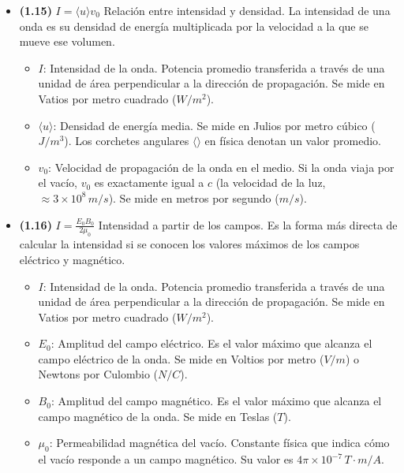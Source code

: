 \documentclass{article}
\begin{document}
\begin{itemize}
				\item \textbf{(1.15)} $\boxed{I=\langle u\rangle v_{0}}$ Relación entre intensidad y densidad. La intensidad de una onda es su densidad de energía multiplicada por la velocidad a la que se mueve ese volumen.
					\begin{itemize}
						\item $I$: Intensidad de la onda. Potencia promedio transferida a través de una unidad de área perpendicular a la dirección de propagación. Se mide en Vatios por metro cuadrado ($W/m^2$).
						\item $\langle u\rangle$: Densidad de energía media. Se mide en Julios por metro cúbico ($J/m^3$). Los corchetes angulares $\langle \rangle$ en física denotan un valor promedio.
						\item $v_0$: Velocidad de propagación de la onda en el medio. Si la onda viaja por el vacío, $v_0$ es exactamente igual a $c$ (la velocidad de la luz, $\approx 3 \times 10^8 \, m/s$). Se mide en metros por segundo ($m/s$).
					\end{itemize}

				\item \textbf{(1.16)} $\boxed{I=\frac{E_{0}B_{0}}{2\mu_{0}}}$ Intensidad a partir de los campos. Es la forma más directa de calcular la intensidad si se conocen los valores máximos de los campos eléctrico y magnético.
					\begin{itemize}
						\item $I$: Intensidad de la onda. Potencia promedio transferida a través de una unidad de área perpendicular a la dirección de propagación. Se mide en Vatios por metro cuadrado ($W/m^2$).
						\item $E_0$: Amplitud del campo eléctrico. Es el valor máximo que alcanza el campo eléctrico de la onda. Se mide en Voltios por metro ($V/m$) o Newtons por Culombio ($N/C$).
						\item $B_0$: Amplitud del campo magnético. Es el valor máximo que alcanza el campo magnético de la onda. Se mide en Teslas ($T$).
						\item $\mu_0$: Permeabilidad magnética del vacío. Constante física que indica cómo el vacío responde a un campo magnético. Su valor es $4\pi \times 10^{-7} \, T\cdot m/A$.
					\end{itemize}


\end{itemize}
\end{document}
